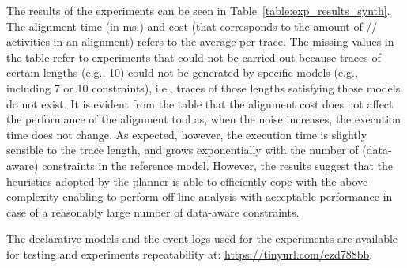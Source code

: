 The results of the experiments can be seen in Table~\ref{table:exp_results_synth}. The alignment time (in ms.) and cost (that corresponds to the amount of // activities in an alignment) refers to the average per trace. The missing values in the table refer to experiments that could not be carried out because traces of certain lengths (e.g., 10) could not be generated by specific models (e.g., including 7 or 10 constraints), i.e., traces of those lengths satisfying those models do not exist. It is evident from the table that the alignment cost does not affect the performance of the alignment tool as, when the noise increases, the execution time does not change. As expected, however, the execution time is slightly sensible to the trace length, and grows exponentially with the number of (data-aware) constraints in the reference model. However, the results suggest that the heuristics adopted by the planner is able to efficiently cope with the above complexity enabling to perform off-line analysis with acceptable performance in case of a reasonably large number of data-aware constraints.


The declarative models and the event logs used for the experiments are available for testing and experiments repeatability at: \url{https://tinyurl.com/ezd788bb}.

%
%

